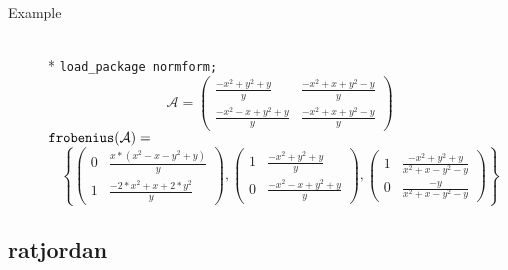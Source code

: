 \begin{description}
\item[Example]\mbox{}\\*
\texttt{load\_package normform;}
\[
\mathcal{A} = \begin{pmatrix} \frac{-x^2+y^2+y}{y} &
\frac{-x^2+x+y^2-y}{y} \\[1mm] \frac{-x^2-x+y^2+y}{y} & \frac{-x^2+x+y^2-y}
{y} \end{pmatrix}
\]
\(
\texttt{frobenius}(\mathcal{A}) =
\)
\[
\left\{
   \begin{pmatrix} 0 & \frac{x*(x^2-x-y^2+y)}{y} \\[1mm]
                   1 & \frac{-2*x^2+x+2*y^2}{y} \end{pmatrix},
   \begin{pmatrix}
     1 & \frac{-x^2+y^2+y}{y} \\[1mm] 0 & \frac{-x^2-x+y^2+y}{y}
   \end{pmatrix},
   \begin{pmatrix} 1 & \frac{-x^2+y^2+y}{x^2+x-y^2-y} \\[1mm]
      0 & \frac{-y}{x^2+x-y^2-y} \end{pmatrix}
 \right\}
\]
\end{description}

\subsection{ratjordan}

